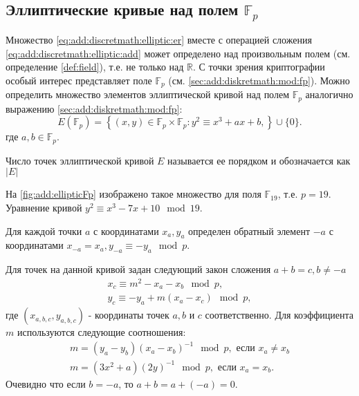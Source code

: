 \subsection{Эллиптические кривые над полем $\mathbb{F}_p$}
Множество \eqref{eq:add:discretmath:elliptic:er} вместе с операцией
сложения \eqref{eq:add:discretmath:elliptic:add} может определено над
произвольным полем (см. определение \ref{def:field}), 
т.е. не только над $\mathbb{R}$. С точки зрения
криптографии особый интерес представляет поле $\mathbb{F}_p$ (см.
\autoref{sec:add:diskretmath:mod:fp}). Можно определить множество
элементов эллиптической кривой над полем $\mathbb{F}_p$ аналогично
выражению \eqref{sec:add:diskretmath:mod:fp}:
\begin{equation}
E\left(\mathbb{F}_p\right) = \left\{ (x,y) \in 
\mathbb{F}_p \times \mathbb{F}_p: 
y^2 \equiv x^3 +ax +b, 
\right\} \cup \{0\}.
\label{eq:add:discretmath:elliptic:fp}
\end{equation}
где $a,b \in \mathbb{F}_p$.

\begin{definition}
\label{def:elliptic_curve_order}
Число точек эллиптической кривой $E$ называется ее порядком и
обозначается как $\left|E\right|$
\end{definition}



На \autoref{fig:add:ellipticFp} изображено такое множество для поля
$\mathbb{F}_{19}$, т.е. $p = 19$. Уравнение кривой $y^2 \equiv x^3 -7
x + 10 \mod 19$. 

Для каждой точки $a$ с координатами $x_a, y_a$ определен обратный
элемент $-a$ с координатами $x_{-a} = x_a, y_{-a} \equiv -y_a \mod p$.

Для точек на данной кривой задан следующий закон сложения $a + b = c,
b \ne -a$
\begin{eqnarray}
x_{c} \equiv m^2 - x_a - x_b \mod p,
\nonumber \\
y_{c} \equiv - y_a + m \left(x_a - x_c\right) \mod p,
\label{eq:add:discretmath:elliptic:addfp}
\end{eqnarray}
где $(x_{a,b,c}, y_{a,b,c})$ - координаты точек $a,b$ и $c$
соответственно. Для коэффициента $m$ используются следующие
соотношения: 
\begin{eqnarray}
m = \left(y_a - y_b\right)\left(x_a - x_b\right)^{-1} \mod p, \mbox{ если } x_a \ne x_b
\nonumber \\
m = \left(3x^2 + a\right)\left(2y\right)^{-1} \mod p, \mbox{ если }
x_a = x_b.
\nonumber
\end{eqnarray}
Очевидно что если $b = -a$, то $a + b = a + (-a) = 0$.

